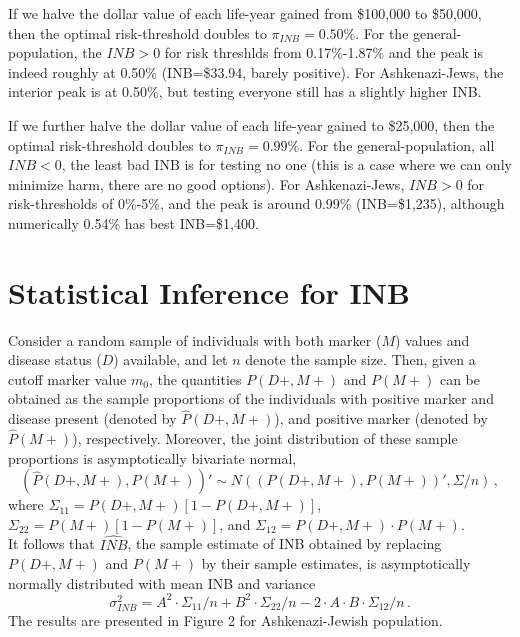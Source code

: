 \documentclass[11pt]{article}
\begin{document}
If we halve the dollar value of each life-year gained from \$100,000 to \$50,000, then the optimal risk-threshold doubles to $\pi_{INB}=0.50\%$.  For the general-population, the $INB>0$ for risk threshlds from 0.17\%-1.87\% and the peak is indeed roughly at 0.50\% (INB=\$33.94, barely positive).  For Ashkenazi-Jews, the interior peak is at 0.50\%, but testing everyone still has a slightly higher INB.  

If we further halve the dollar value of each life-year gained to \$25,000, then the optimal risk-threshold doubles to $\pi_{INB}=0.99\%$.  For the general-population, all $INB<0$, the least bad INB is for testing no one (this is a case where we can only minimize harm, there are no good options).  For Ashkenazi-Jews, $INB>0$ for risk-thresholds of 0\%-5\%, and the peak is around 0.99\% (INB=\$1,235), although numerically 0.54\% has best INB=\$1,400.


\section{Statistical Inference for INB}

Consider a random sample of individuals with both marker ($M$) values and disease status ($D$) available, and let $n$ denote the sample size. Then, given a cutoff marker value $m_0$, the quantities $P(D+,M+)$ and $P(M+)$ can be obtained as the sample proportions of the individuals with positive marker and disease present (denoted by $\hat{P}(D+,M+)$), and positive marker (denoted by $\hat{P}(M+)$), respectively. Moreover, the joint distribution of these sample proportions is asymptotically bivariate normal,
\begin{equation}\label{sample_proportions}
\left(\hat{P}(D+,M+),\hat{P}(M+) \right)' \sim N\left(\left({P}(D+,M+),{P}(M+) \right)', \Sigma/n \right)\,,
\end{equation}
where $\Sigma_{11}= {P}(D+,M+)[1-{P}(D+,M+)]$, $\Sigma_{22}= {P}(M+)[1-{P}(M+)]$, and $\Sigma_{12}= {P}(D+,M+)\cdot{P}(M+)$.\\
It follows that $\widehat{INB}$, the sample estimate of INB obtained by replacing ${P}(D+,M+)$ and ${P}(M+)$ by their sample estimates, is asymptotically normally distributed with mean INB and variance 
\begin{equation}\label{sigma_INB}
\sigma^2_{INB} = A^2\cdot \Sigma_{11}/n + B^2\cdot \Sigma_{22}/n - 2\cdot A\cdot B \cdot \Sigma_{12}/n \,.
\end{equation} 
The results are presented in Figure 2 for Ashkenazi-Jewish population. %
\end{document}
